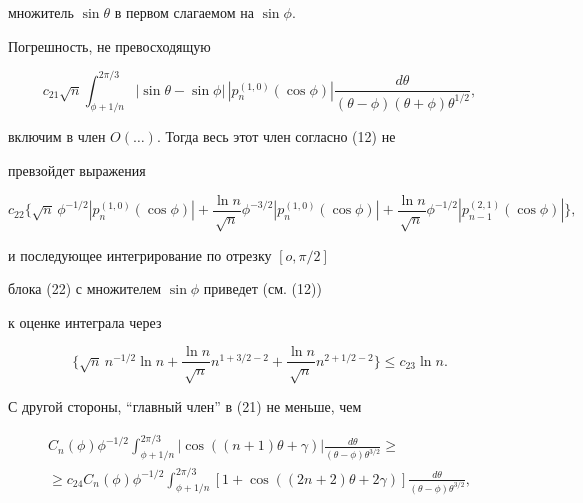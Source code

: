 множитель $\sin \theta$ в первом слагаемом на $\sin \phi$.


Погрешность, не превосходящую


$$


c_{21} \sqrt n \int_{\phi+{1}/{n}}^{{2\pi}/{3}}


|\sin \theta -\sin\phi|\, |p_n^{(1,0)}(\cos\phi)|


\frac{ d\theta}{(\theta-\phi)(\theta+\phi)\theta^{{1}/{2}}},


$$


включим в член $O(\dotsc)$. Тогда весь этот член согласно (12) не


превзойдет выражения


\begin{equation}


c_{22}\bigg \{\sqrt n \,\phi^{-1/2}|p_n^{(1,0)}(\cos\phi)|


+\frac{\ln n}{\sqrt n}\phi^{-{3}/{2}}|p_n^{(1,0)}(\cos\phi)|


+\frac{\ln n}{\sqrt n}\phi^{-{1}/{2}}|p_{n-1}^{(2,1)}(\cos\phi)|\bigg \},


\end{equation}


и последующее интегрирование по отрезку $[o,{\pi}/{2}] $


блока (22) с множителем $\sin \phi $ приведет (см. (12))


к оценке интеграла через


\begin{equation}


\{\sqrt {n}\, n^{-1/2}\ln n + \frac {\ln n}{\sqrt n}


n^{1+3/2-2} + \frac{\ln n}{\sqrt n} n^{2+1/2-2}\}\le


c_{23} \ln n.


\end{equation}


С другой стороны, ``главный член'' в (21) не меньше, чем


\begin{multline*}


C_n (\phi)\phi^{-1/2}\int_{\phi +1/n}


^{2\pi /3}|\cos((n+1)\theta +\gamma)|


\frac{ d\theta}{(\theta-\phi)\theta^{3/2}}\ge \\


%


\ge c_{24} C_n (\phi)\phi^{-1/2}


\int_{\phi +1/n}^{{2\pi}/{3}}[1+\cos((2n+2)\theta +2\gamma)]


\frac{ d\theta}{(\theta-\phi)\theta^{3/2}},


\end{multline*}


